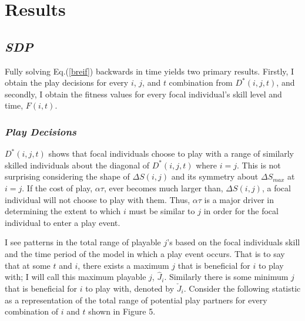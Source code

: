 \documentclass[12pt,letterpaper]{article}
\begin{document}
    
    


\section{Results}
  \subsection{\it SDP}
    Fully solving Eq.(\ref{breif}) backwards in time yields two primary results.
    Firstly, I obtain the play decisions for every $i$, $j$, and $t$ combination from $D^*(i,j,t)$, and secondly, I obtain the fitness values for every focal individual's skill level and time, $F(i,t)$. 
    
    \subsubsection{\it Play Decisions}
      $D^*(i,j,t)$ shows that focal individuals choose to play with a range of similarly skilled individuals about the diagonal of $D^*(i,j,t)$ where $i=j$.
      This is not surprising considering the shape of $\Delta S(i,j)$ and its symmetry about $\Delta S_{max}$ at $i=j$.
      If the cost of play, $\alpha \tau$, ever becomes much larger than, $\Delta S(i,j)$, a focal individual will not choose to play with them.
      Thus, $\alpha \tau$ is a major driver in determining the extent to which $i$ must be similar to $j$ in order for the focal individual to enter a play event. 
     
      I see patterns in the total range of playable $j$'s based on the focal individuals skill and the time period of the model in which a play event occurs. %
      That is to say that at some $t$ and $i$, there exists a maximum $j$ that is beneficial for $i$ to play with; I will call this maximum playable $j$, $\hat J_{i}$.
      Similarly there is some minimum $j$ that is beneficial for $i$ to play with, denoted by $\check J_{i}$.
      Consider the following statistic as a representation of the total range of potential play partners for every combination of $i$ and $t$ shown in Figure 5.
      
\end{document}
